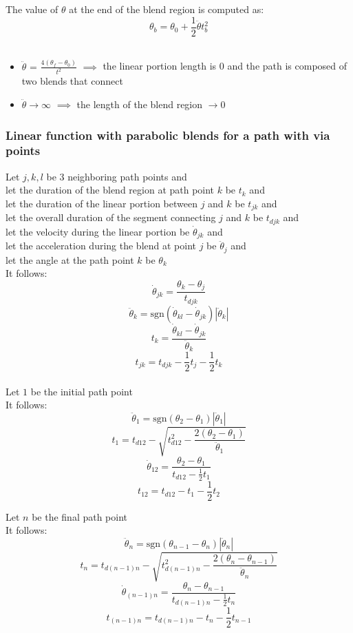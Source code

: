 \documentclass[10pt,a4paper]{article}
\begin{document}
The value of $\theta$ at the end of the blend region is computed as:
$$
	\theta_b = \theta_0 + \frac 1 2 \ddot \theta t_b^2
$$
\\

\begin{itemize}
	\item $\ddot{\theta} \textbf{ = } \frac{4(\theta_f - \theta_0)}{t^2}$ $\implies$ the linear portion  length is 0 and the path is composed of two blends that connect
	\item $\ddot{\theta} → ∞$ $\implies$ the length of the blend region $→ 0$
\end{itemize}

\subsubsection{Linear function with parabolic blends for a path with via points}
Let $j,k,l$ be 3 neighboring path points and \\
let the duration of the blend region at path point $k$ be $t_k$ and \\
let the duration of the linear portion between $j$ and $k$ be $t_{jk}$ and \\
let the overall duration of the segment connecting $j$ and $k$ be $t_{djk}$ and \\
let the velocity during the linear portion be $\dot{\theta}_{jk}$ and \\
let the acceleration during the blend at point $j$ be $\ddot{\theta}_j$ and \\
let the angle at the path point $k$ be $\theta_k$ \\
It follows:
$$
	\dot{\theta}_{jk} = \frac{\theta_k - \theta_j}{t_{djk}}
$$
$$
	\ddot{\theta}_k = \textrm{sgn}(\dot{\theta}_{kl} - \dot{\theta}_{jk})|\ddot{\theta}_k|
$$
$$
	t_k = \frac{\dot{\theta}_{kl} - \dot{\theta}_{jk}}{\ddot{\theta}_k}
$$
$$
	t_{jk} = t_{djk} - \frac 1 2 t_j - \frac 1 2 t_k
$$
\\

Let $1$ be the initial path point \\
It follows: \\
$$
	\ddot{\theta}_1 = \textrm{sgn}(\theta_2 - \theta_1)|\ddot{\theta}_1|
$$
$$
	t_1 = t_{d12} - \sqrt{t_{d12}^2 - \frac{2(\theta_2 - \theta_1)}{\ddot{\theta}_1}}
$$
$$
	\dot{\theta}_{12} = \frac{\theta_2 - \theta_1}{t_{d12} - \frac 1 2 t_1}
$$
$$
	t_{12} = t_{d12} - t_1 - \frac 1 2 t_2
$$

Let $n$ be the final path point \\
It follows: \\
$$
\ddot{\theta}_n = \textrm{sgn}(\theta_{n-1} - \theta_n)|\ddot{\theta}_n|
$$
$$
t_n = t_{d(n-1)n} - \sqrt{t_{d(n-1)n}^2 - \frac{2(\theta_n - \theta_{n-1})}{\ddot{\theta}_n}}
$$
$$
\dot{\theta}_{(n-1)n} = \frac{\theta_n - \theta_{n-1}}{t_{d(n-1)n} - \frac 1 2 t_n}
$$
$$
t_{(n-1)n} = t_{d(n-1)n} - t_n - \frac 1 2 t_{n-1}
$$
\end{document}
